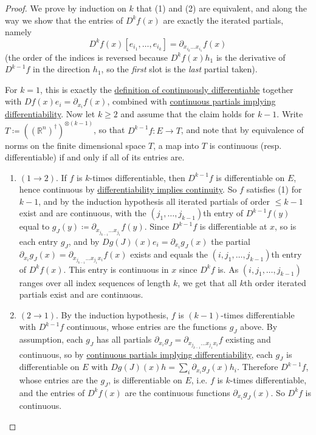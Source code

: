   \begin{proof}
    We prove by induction on $k$ that (1) and (2) are equivalent, and along the way we show that the entries of $D^k f(x)$ are exactly the iterated partials, namely 
    \begin{equation}
      D^k f(x) [e_{i_1}, \ldots, e_{i_k}] = \partial_{x_{i_k} \ldots x_{i_1}} f (x) 
    \end{equation}
    (the order of the indices is reversed because $D^k f(x) h_1$ is the derivative of $D^{k-1} f$ in the direction $h_1$, so the \textit{first} slot is the \textit{last} partial taken). 

    For $k = 1$, this is exactly the \hyperref[def:continuously-differentiable]{definition of continuously differentiable} together with \hyperref[thm:action-of-derivative-on-basis-vectors]{$Df(x) e_i = \partial_{x_i} f(x)$}, combined with \hyperref[thm:continuous-partials-implies-differentiability]{continuous partials implying differentiability}. Now let $k \geq 2$ and assume that the claim holds for $k - 1$. Write $T \coloneqq ((\mathbb{R}^n)^\dagger)^{\otimes (k-1)}$, so that $D^{k-1} f: E \to T$, and note that by equivalence of norms on the finite dimensional space $T$, a map into $T$ is continuous (resp. differentiable) if and only if all of its entries are. 
    \begin{enumerate}
      \item $(1 \to 2)$. If $f$ is $k$-times differentiable, then $D^{k-1} f$ is differentiable on $E$, hence continuous by \hyperref[thm:differentiability-implies-continuity]{differentiability implies continuity}. So $f$ satisfies (1) for $k-1$, and by the induction hypothesis all iterated partials of order $\leq k-1$ exist and are continuous, with the $(j_1, \ldots, j_{k-1})$th entry of $D^{k-1} f(y)$ equal to $g_J(y) \coloneqq \partial_{x_{j_{k-1}} \ldots x_{j_1}} f(y)$. Since $D^{k-1} f$ is differentiable at $x$, so is each entry $g_J$, and by $Dg(J)(x) e_i = \partial_{x_i} g_J(x)$ the partial $\partial_{x_i} g_J (x) = \partial_{x_{j_{k-1}} \ldots x_{j_1} x_i} f(x)$ exists and equals the $(i, j_1, \ldots, j_{k-1})$th entry of $D^k f(x)$. This entry is continuous in $x$ since $D^k f$ is. As $(i, j_1, \ldots, j_{k-1})$ ranges over all index sequences of length $k$, we get that all $k$th order iterated partials exist and are continuous. 

      \item $(2 \to 1)$. By the induction hypothesis, $f$ is $(k-1)$-times differentiable with $D^{k-1} f$ continuous, whose entries are the functions $g_J$ above. By assumption, each $g_J$ has all partials $\partial_{x_i} g_J = \partial_{x_{j_{k-1}} \ldots x_{j_1} x_i} f$ existing and continuous, so by \hyperref[thm:continuous-partials-implies-differentiability]{continuous partials implying differentiability}, each $g_J$ is differentiable on $E$ with $Dg(J) (x) h = \sum_i \partial_{x_i} g_J(x) h_i$. Therefore $D^{k-1} f$, whose entries are the $g_J$, is differentiable on $E$, i.e. $f$ is $k$-times differentiable, and the entries of $D^k f(x)$ are the continuous functions $\partial_{x_i} g_J(x)$. So $D^k f$ is continuous. 
    \end{enumerate}
  \end{proof}

